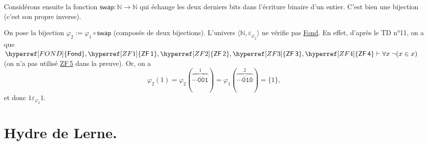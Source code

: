 \documentclass{../notes}
\newcommand\zf[1]{\hyperref[ZF#1]{\textsf{ZF\,#1}}}
\newcommand\fond{\hyperref[FOND]{\textsf{Fond}}}
\newcommand\inphi[1][\relax]{\ensuremath{\mathrel{\varepsilon_{\varphi_{#1}}}}}
\begin{document}
\begin{enumerate}
      Considérons ensuite la fonction $\mathsf{swap} : \mathds{N}\to \mathds{N}$ qui échange les deux derniers bits dans l'écriture binaire d'un entier.
      C'est bien une bijection (c'est son propre inverse).

      On pose la bijection $\varphi_2 := \varphi_1 \circ \mathsf{swap}$ (composée de deux bijections).
      L'univers $\langle \mathds{N}, \inphi[2] \rangle$ ne vérifie pas \fond.
      En effet, d'après le TD n°11, on a que $\fond, \zf 1, \zf 2, \zf 3, \zf 4 \vdash \forall x \: \lnot (x \in x)$ (on n'a pas utilisé \zf 5 dans la preuve).
      Or, on a \[
        \varphi_2(1) = \varphi_2(\overbrace{\overline{\mathtt{\cdots001}}}^1) = \varphi_1(\overbrace{\overline{\mathtt{\cdots 010}}}^2) = \{1\} 
      ,\]
      et donc $1 \inphi[2] 1$.
  \end{enumerate}

  \chapter{Hydre de Lerne.}
\end{document}
